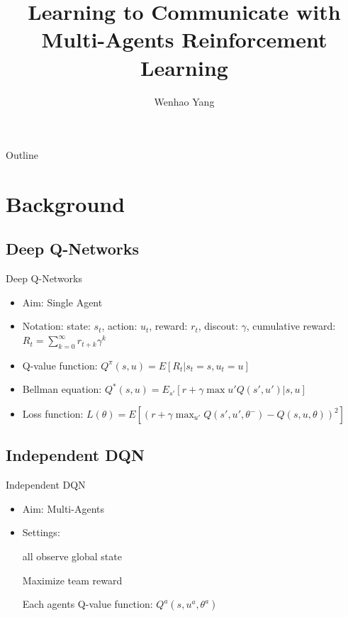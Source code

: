 \documentclass[mathserif]{beamer}
\begin{document}
\title{Learning to Communicate with Multi-Agents Reinforcement Learning}

\author{Wenhao Yang
}
\begin{frame}
  \titlepage
\end{frame}

\date{}

\begin{frame}{Outline}
\tableofcontents
\end{frame}
\section{Background}
\subsection{Deep Q-Networks}
\begin{frame}{Deep Q-Networks}
\begin{itemize}
  \item Aim: Single Agent
  \item Notation: state: $s_{t}$, action: $u_{t}$, reward: $r_{t}$, discout: $\gamma$,
  cumulative reward: $R_{t}=\sum_{k=0}^{\infty}r_{t+k}\gamma^{k}$
  \item Q-value function: $Q^{\pi}(s,u)=E[R_{t}|s_{t}=s,u_{t}=u]$
  \item Bellman equation: $Q^{*}(s,u)=E_{s'}[r+\gamma\max{u'}Q(s',u')|s,u]$
  \item Loss function: $L(\theta)=E[(r+\gamma\max_{u'}Q(s',u',\theta^{-})-Q(s,u,\theta))^{2}]$
\end{itemize}
\end{frame}
\subsection{Independent DQN}
\begin{frame}{Independent DQN}
\begin{itemize}
  \item Aim: Multi-Agents
  \item Settings:

  all observe global state

  Maximize team reward

  Each agents Q-value function: $Q^{a}(s,u^{a},\theta^{a})$
\end{itemize}
\end{frame}
\end{document}
